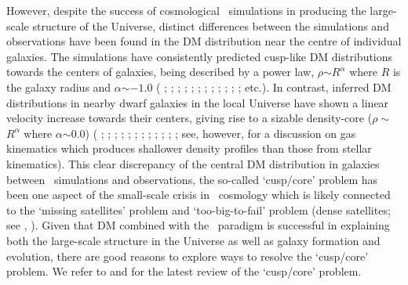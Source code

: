 \documentclass[natbib209]{emulateapj}
\begin{document}
However, despite the success of cosmological \LCDM\ simulations in producing the
large-scale structure of the Universe, distinct differences between the
simulations and observations have
been found in the DM distribution near the centre of individual
galaxies. The simulations have consistently predicted cusp-like DM 
distributions towards the centers of galaxies,
being described by a power law, $\rho$$\sim$$R^{\alpha}$ where $R$ is the galaxy
radius and $\alpha$$\sim$$-1.0$ (\citeauthor{Moore_1994}
\citeyear{Moore_1994}; \citeauthor{NFW_1996} \citeyear{NFW_1996};
\citeauthor{NFW_1997} \citeyear{NFW_1997}; \citeauthor{Moore_1999a}
\citeyear{Moore_1999a}; \citeauthor{Ghigna_2000} \citeyear{Ghigna_2000};
\citeauthor{Klypin_2001} \citeyear{Klypin_2001}; \citeauthor{Power_2002}
\citeyear{Power_2002}; \citeauthor{Stoehr_2003} \citeyear{Stoehr_2003};
\citeauthor{Navarro_2004} \citeyear{Navarro_2004}; \citeauthor{Diemand_2008}
\citeyear{Diemand_2008}; \citeauthor{2009MNRAS.398L..21S}
\citeyear{2009MNRAS.398L..21S}; \citeauthor{Navarro_2010} \citeyear{Navarro_2010};
\citeauthor{2013ApJ...767..146I} \citeyear{2013ApJ...767..146I} etc.). In contrast, inferred DM distributions in nearby dwarf galaxies in the local Universe have shown a
linear velocity increase towards their centers, giving rise to a sizable density-core
($\rho\sim$$R^{\alpha}$ where $\alpha$$\sim$$0.0$) (\citeauthor{Moore_1994}
\citeyear{Moore_1994}; \citeauthor{deBlok_1996}
\citeyear{deBlok_1996}; \citeauthor{deBlok_1997} \citeyear{deBlok_1997};
\citeauthor{deBlok_2001} \citeyear{deBlok_2001}; \citeauthor{deBlok_2002}
\citeyear{deBlok_2002}; \citeauthor{Weldrake_2003} \citeyear{Weldrake_2003};
\citeauthor{Spekkens_2005} \citeyear{Spekkens_2005};
\citeauthor{Kuzio_de_Naray_2006} \citeyear{Kuzio_de_Naray_2006};
\citeauthor{Kuzio_de_Naray_2008} \citeyear{Kuzio_de_Naray_2008};
\citeauthor{Oh_2008} \citeyear{Oh_2008}; \citeauthor{Oh_2011a}
\citeyear{Oh_2011a}; \citeauthor{Oh_2011b} \citeyear{Oh_2011b}; see, however,
\citeauthor{2014ApJ...789...63A} \citeyear{2014ApJ...789...63A} for a discussion
on gas kinematics which produces shallower density profiles than those from
stellar kinematics).
This clear discrepancy of the central DM
distribution in galaxies between \LCDM\ simulations and observations, the
so-called `cusp/core' problem has been one aspect of the small-scale crisis in
\LCDM\ cosmology which is likely connected to the `missing satellites' problem
\citep{2013ApJ...765...22B} and `too-big-to-fail' problem
(dense satellites; see \citeauthor{2011MNRAS.415L..40B}
\citeyear{2011MNRAS.415L..40B}, \citeyear{2012MNRAS.422.1203B}).  
Given that DM combined with 
the \LCDM\ paradigm is successful in explaining both the large-scale structure 
in the Universe as well as galaxy formation and evolution, there are good
reasons to explore ways to resolve the `cusp/core' problem. We refer to 
\cite{deBlok_2010} and \cite{Pontzen_2014} for the latest review of the `cusp/core' problem.
\end{document}
